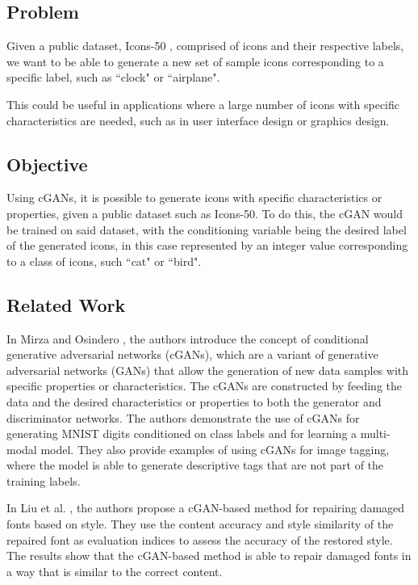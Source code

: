 \documentclass[conference]{IEEEtran}
\begin{document}
\subsection{Problem}
Given a public dataset, Icons-50 \cite{Icons50, Hendrycks2018}, comprised of icons and their respective labels, we want to be able to generate a new set of sample icons corresponding to a specific label, such as ``clock" or ``airplane".

This could be useful in applications where a large number of icons with specific characteristics are needed, such as in user interface design or graphics design.

\subsection{Objective}
Using cGANs, it is possible to generate icons with specific characteristics or properties, given a public dataset such as Icons-50. To do this, the cGAN would be trained on said dataset, with the conditioning variable being the desired label of the generated icons, in this case represented by an integer value corresponding to a class of icons, such ``cat" or ``bird".

\subsection{Related Work}
In Mirza and Osindero \cite{Mirza2014}, the authors introduce the concept of conditional generative adversarial networks (cGANs), which are a variant of generative adversarial networks (GANs) that allow the generation of new data samples with specific properties or characteristics. The cGANs are constructed by feeding the data and the desired characteristics or properties to both the generator and discriminator networks. The authors demonstrate the use of cGANs for generating MNIST digits conditioned on class labels and for learning a multi-modal model. They also provide examples of using cGANs for image tagging, where the model is able to generate descriptive tags that are not part of the training labels.

In Liu et al. \cite{Liu2021SCCGAN:CGAN}, the authors propose a cGAN-based method for repairing damaged fonts based on style. They use the content accuracy and style similarity of the repaired font as evaluation indices to assess the accuracy of the restored style. The results show that the cGAN-based method is able to repair damaged fonts in a way that is similar to the correct content.
\end{document}
